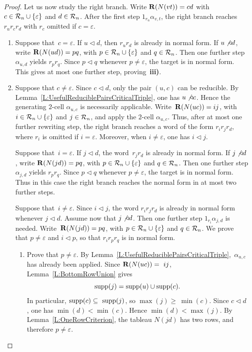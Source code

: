 \documentclass[a4paper, twoside, 11pt, english]{article}
\begin{document}
\begin{proof}
Let us now study the right branch.
Write $\mathbf{R}(N(vt))=cd$ with $c\in\mathcal{R}_n\cup\{\varepsilon\}$ and $d\in\mathcal{R}_n$.
After the first step $1_{r_u}\alpha_{v,t}$, the right branch reaches
$r_u r_c r_d$ with $r_c$ omitted if $c=\varepsilon$.

\begin{enumerate}[\bf A)]
\item Suppose that~$c=\varepsilon$.
If $u\triangleleft d$, then $r_u r_d$ is already in normal form.
If $u\not\triangleleft d$, write $\mathbf{R}(N(ud))=pq$, with
$p\in\mathcal{R}_n\cup\{\varepsilon\}$ and $q\in\mathcal{R}_n$.
Then one further step $\alpha_{u,d}$ yields $r_p r_q$.
Since $p\triangleleft q$ whenever $p\neq\varepsilon$, the target is in normal
form. This gives at most one further step, proving~{\bf iii)}.

\item Suppose that $c\neq\varepsilon$.
Since $c\triangleleft d$, only the pair $(u,c)$ can be reducible.
By Lemma~\ref{L:UsefulReduciblePairsCriticalTriple}, one has
$u\not\triangleleft c$. Hence the generating $2$-cell
$\alpha_{u,c}$ is necessarily applicable.
Write~$\mathbf{R}(N(uc))=ij$,
with $i\in\mathcal{R}_n\cup\{\varepsilon\}$ and $j\in\mathcal{R}_n$, and apply the $2$-cell
$\alpha_{u,c}$. Thus, after at most one further rewriting step, the right
branch reaches a word of the form $r_i r_j r_d$, where $r_i$ is omitted if
$i=\varepsilon$. Moreover, when $i\neq\varepsilon$, one has
$i\triangleleft j$.

 Suppose that~$i=\varepsilon$.
If $j\triangleleft d$, the word~$r_j r_d$ is already in normal form.
If $j\not\triangleleft d$, write $\mathbf{R}(N(jd))=pq$, with
$p\in\mathcal{R}_n\cup\{\varepsilon\}$ and $q\in\mathcal{R}_n$.
Then one further step $\alpha_{j,d}$ yields $r_p r_q$.
Since $p\triangleleft q$ whenever $p\neq\varepsilon$, the target is in normal
form. Thus in this case the right branch reaches the normal form in at most
two further steps.

Suppose that~$i\neq\varepsilon$.
Since $i\triangleleft j$, the word $r_i r_j r_d$ is already in normal form
whenever $j\triangleleft d$.
Assume now that $j\not\triangleleft d$. Then one further step
$1_{r_i}\alpha_{j,d}$ is needed. Write~$\mathbf{R}(N(jd))=pq$,
with $p\in\mathcal{R}_n\cup\{\varepsilon\}$ and $q\in\mathcal{R}_n$.
We prove that $p\neq\varepsilon$ and $i\triangleleft p$, so that
$r_i r_p r_q$ is in normal form.

\begin{enumerate}[\bf a)]
\item Prove that $p\neq\varepsilon$.
By Lemma~\ref{L:UsefulReduciblePairsCriticalTriple},~$\alpha_{u,c}$ has already been applied. Since
$\mathbf{R}(N(uc))=~ij$, Lemma~\ref{L:BottomRowUnion} gives
\[
\operatorname{supp}(j)=\operatorname{supp}(u)\cup\operatorname{supp}(c).
\]
In particular, $\operatorname{supp}(c)\subseteq~\operatorname{supp}(j)$, so $\max(j)\ge~\min(c)$.
Since $c\triangleleft d$, one has $\min(d)<\min(c)$. Hence
$\min(d)<\max(j)$. By Lemma~\ref{L:OneRowCriterion}, the tableau $N(jd)$
has two rows, and therefore $p\neq\varepsilon$.


\end{enumerate}
\end{enumerate}
\end{proof}
\end{document}

